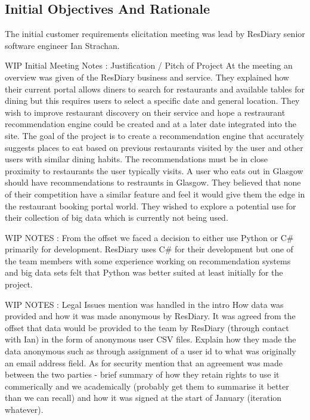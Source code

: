\documentclass{l3proj}
\begin{document}
\subsection{Initial Objectives And Rationale}
\label{initobjectives}

The initial customer requirements elicitation meeting was lead by ResDiary senior software engineer Ian Strachan. 

WIP Initial Meeting Notes : Justification / Pitch of Project
At the meeting an overview was given of the ResDiary business and service. 
They explained how their current portal allows diners to search for restaurants and available tables for dining but this requires users to select a specific date and general location. 
They wish to improve restaurant discovery on their service and hope a restraurant recommendation engine could be created and at a later date integrated into the site.
The goal of the project is to create a recommendation engine that accurately suggests places to eat based on previous restaurants visited by the user and other users with similar dining habits.
The recommendations must be in close proximity to restaurants the user typically visits. A user who eats out in Glasgow should have recommendations to restraunts in Glasgow.
They believed that none of their competition have a similar feature and feel it would give them the edge in the restaurant booking portal world.
They wished to explore a potential use for their collection of big data which is currently not being used. 

WIP NOTES : 
From the offset we faced a decision to either use Python or C\# primarily for development. ResDiary uses C\# for their development but one of the team members with some experience working on recommendation systems and big data sets felt that Python was better suited at least initially for the project. 

WIP NOTES : 
Legal Issues mention was handled in the intro
How data was provided and how it was made anonymous by ResDiary.
It was agreed from the offset that data would be provided to the team by ResDiary (through contact with Ian) in the form of anonymous user CSV files. Explain how they made the data anonymous such as through assignment of a user id to what was originally an email address field.
As for security mention that an agreement was made between the two parties - brief summary of how they retain rights to use it commerically and we academically (probably get them to summarise it better than we can recall) and how it was signed at the start of January (iteration whatever).
\end{document}
